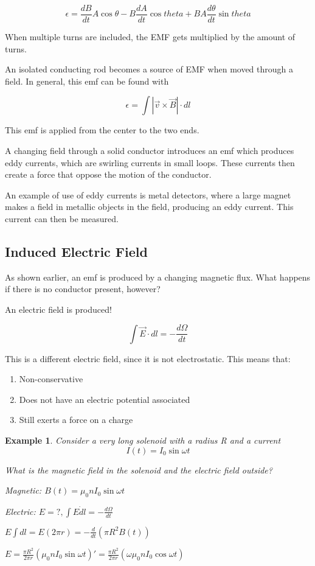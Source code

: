 \documentclass{article}
\newtheorem{example}{Example}
\begin{document}
$$\epsilon=\frac{dB}{dt}A\cos{\theta}-B\frac{dA}{dt}\cos{theta}+BA\frac{d\theta}{dt}\sin{theta}$$

When multiple turns are included, the EMF gets multiplied by the amount of turns.

An isolated conducting rod becomes a source of EMF when moved through a field. In general, this emf can be found with 

$$\epsilon=\int{|\vec{v}\times\vec{B}|\cdot dl}$$

This emf is applied from the center to the two ends.

A changing field through a solid conductor introduces an emf which produces eddy currents, which are swirling currents in small loops.
These currents then create a force that oppose the motion of the conductor.

An example of use of eddy currents is metal detectors, where a large magnet makes a field in metallic objects in the field, producing 
an eddy current. This current can then be measured.

\subsection{Induced Electric Field}
As shown earlier, an emf is produced by a changing magnetic flux. What happens if there is no conductor present, however?

An electric field is produced!

$$\int{\vec{E}\cdot dl}=-\frac{d\Omega}{dt}$$

This is a different electric field, since it is not electrostatic. This means that:

\begin{enumerate}
	\item Non-conservative
	\item Does not have an electric potential associated
	\item Still exerts a force on a charge
\end{enumerate}

\begin{example}
	Consider a very long solenoid with a radius R and a current
	 $$I(t)=I_0\sin{\omega t}$$

	 What is the magnetic field in the solenoid and the electric field outside?

	 Magnetic: $B(t)=\mu_0 n I_0\sin{\omega t}$

	 Electric: $E=?, \int{E\dot dl}=-\frac{d\Omega}{dt}$

	 $E\int{dl}=E(2\pi r)=-\frac{d}{dt}(\pi R^2 B(t))$

	 $E=\frac{\pi R^2}{2\pi r} (\mu_0 n I_0 \sin{\omega t})'=\frac{\pi R^2}{2\pi r} (\omega \mu_0 n I_0 \cos{\omega t})$
 \end{example}
\end{document}
